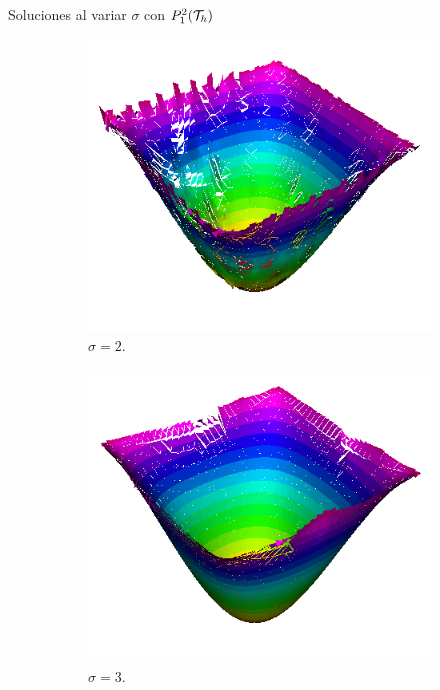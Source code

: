 \begin{frame}{Soluciones al variar $\sigma$ con $\relax{P}_1^2(\mathcal{T}_h)$}
\begin{figure}[h!]
\begin{subfigure}[b]{0.27\textwidth}
				\includegraphics[scale=0.20]{img/Difusion/Recortes/steady_diffusion_approx_sigma_2.png}
				\caption{$\sigma=2$.}
			\end{subfigure}
			\begin{subfigure}[b]{0.27\textwidth}
				\centering
				\includegraphics[scale=0.20]{img/Difusion/Recortes/steady_diffusion_approx_sigma_3.png}
				\caption{$\sigma=3$.}
			\end{subfigure}
			\begin{subfigure}[b]{0.27\textwidth}
				\centering

\end{subfigure}
\end{figure}
\end{frame}
